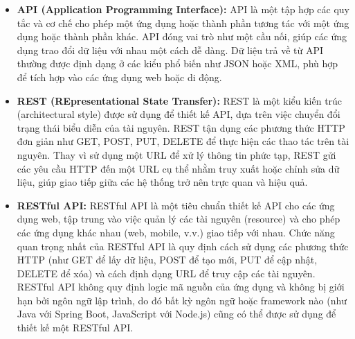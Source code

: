 \begin{itemize}
    \item \textbf{API (Application Programming Interface):} API là một tập hợp các quy tắc và cơ chế cho phép một ứng dụng hoặc thành phần tương tác với một ứng dụng hoặc thành phần khác. API đóng vai trò như một cầu nối, giúp các ứng dụng trao đổi dữ liệu với nhau một cách dễ dàng. Dữ liệu trả về từ API thường được định dạng ở các kiểu phổ biến như JSON hoặc XML, phù hợp để tích hợp vào các ứng dụng web hoặc di động.
    
    \item \textbf{REST (REpresentational State Transfer):} REST là một kiểu kiến trúc (architectural style) được sử dụng để thiết kế API, dựa trên việc chuyển đổi trạng thái biểu diễn của tài nguyên. REST tận dụng các phương thức HTTP đơn giản như GET, POST, PUT, DELETE để thực hiện các thao tác trên tài nguyên. Thay vì sử dụng một URL để xử lý thông tin phức tạp, REST gửi các yêu cầu HTTP đến một URL cụ thể nhằm truy xuất hoặc chỉnh sửa dữ liệu, giúp giao tiếp giữa các hệ thống trở nên trực quan và hiệu quả.
    
    \item \textbf{RESTful API:} RESTful API là một tiêu chuẩn thiết kế API cho các ứng dụng web, tập trung vào việc quản lý các tài nguyên (resource) và cho phép các ứng dụng khác nhau (web, mobile, v.v.) giao tiếp với nhau. Chức năng quan trọng nhất của RESTful API là quy định cách sử dụng các phương thức HTTP (như GET để lấy dữ liệu, POST để tạo mới, PUT để cập nhật, DELETE để xóa) và cách định dạng URL để truy cập các tài nguyên. RESTful API không quy định logic mã nguồn của ứng dụng và không bị giới hạn bởi ngôn ngữ lập trình, do đó bất kỳ ngôn ngữ hoặc framework nào (như Java với Spring Boot, JavaScript với Node.js) cũng có thể được sử dụng để thiết kế một RESTful API.
\end{itemize}


